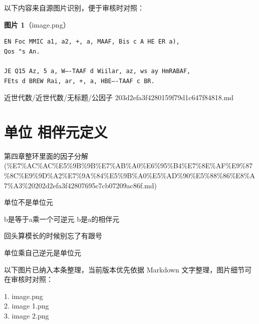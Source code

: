 \begin{note}
以下内容来自源图片识别，便于审核时对照：

\textbf{图片 1}（image.png）
\begin{Verbatim}[fontsize=\small]
EN Foc MMIC a1, a2, +, a, MAAF, Bis c A HE ER a),
Qos "s An.

JE Q15 Az, 5 a, W—-TAAF d Wiilar, az, ws ay HmRABAF,
FEts d BREW Rai, ar, +, a, HBE—-TAAF c BR.
\end{Verbatim}

\end{note}

\begin{note}[来源路径]

近世代数/近世代数/无标题/公因子 203d2efa3f4280159f79d1c647f84818.md

\end{note}

\section*{单位 相伴元定义}

\begin{note}[来源上级主题]

第四章整环里面的因子分解 (\%E7\%AC\%AC\%E5\%9B\%9B\%E7\%AB\%A0\%E6\%95\%B4\%E7\%8E\%AF\%E9\%87\%8C\%E9\%9D\%A2\%E7\%9A\%84\%E5\%9B\%A0\%E5\%AD\%90\%E5\%88\%86\%E8\%A7\%A3\%20202d2efa3f42807695c7cb07209ac86f.md)

\end{note}

\begin{definition}[单位 相伴元定义]

单位不是单位元

b是等于a乘一个可逆元 b是a的相伴元

回头算模长的时候别忘了有跟号

单位乘自己逆元是单位元

\end{definition}

\begin{note}[关联图片]
以下图片已纳入本条整理，当前版本优先依据 Markdown 文字整理，图片细节可在审核时对照：

1. image.png\\
2. image 1.png\\
3. image 2.png\\

\end{note}

